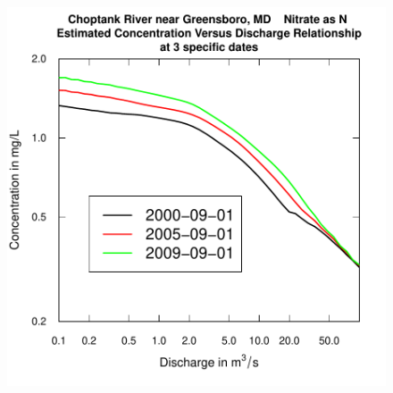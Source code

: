 \documentclass[a4paper,11pt]{article}
\begin{document}
\begin{figure}[htbp]
\begin{minipage}[h]{0.5\linewidth}
\begin{center}
\includegraphics{EGRET-figplotLogConcQSmooth}
    \label{fig:plotLogConcQSmooth}
    \end{center}
  \end{minipage}
  \caption{}
  \label{fig:plotConcQSmoothANDplotLogConcQSmooth}
\end{figure}

\end{document}
